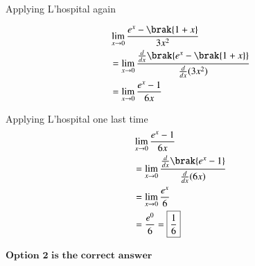 \documentclass[journal]{IEEEtran}
\begin{document}
Applying L'hospital again 

\begin{align}
    & \lim\limits_{x\to0} \frac{e^x - \brak{1+x}}{3x^2} \\
    &= \lim\limits_{x\to0}\frac{\frac{d}{dx}\brak{e^x - \brak{1+x}}}{\frac{d}{dx}(3x^2)} \\
    &= \lim\limits_{x\to0} \frac{e^x - 1}{6x} \\
\end{align}

Applying L'hospital one last time
\begin{align}
    & \lim\limits_{x\to0} \frac{e^x - 1}{6x} \\
    &= \lim\limits_{x\to0}\frac{\frac{d}{dx}\brak{e^x - 1}}{\frac{d}{dx}(6x)} \\
    &= \lim\limits_{x\to0} \frac{e^x}{6} \\
    & = \frac{e^0}{6} = \boxed{\frac{1}{6}}
\end{align}

\begin{center}
$\boxed{\textbf{Option 2 is the correct answer}}$
\end{center}
\end{document}
